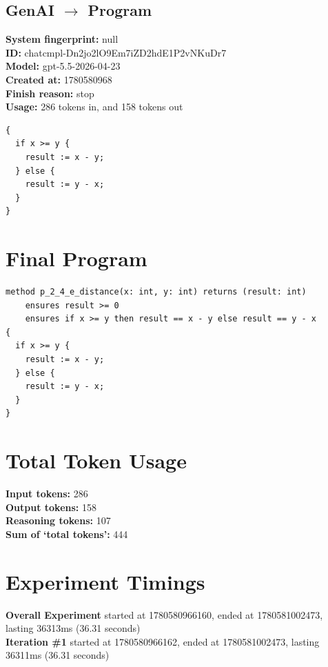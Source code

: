 \documentclass{article}
\begin{document}
\subsection*{GenAI $\rightarrow$ Program}
\textbf{System fingerprint: }null
\\\textbf{ID: }chatcmpl-Dn2jo2lO9Em7iZD2hdE1P2vNKuDr7
\\\textbf{Model: }gpt-5.5-2026-04-23
\\\textbf{Created at: }1780580968
\\\textbf{Finish reason: }stop
\\\textbf{Usage: }286 tokens in, and 158 tokens out
\begin{lstlisting}
{
  if x >= y {
    result := x - y;
  } else {
    result := y - x;
  }
}
\end{lstlisting}
\section*{Final Program}
\begin{lstlisting}
method p_2_4_e_distance(x: int, y: int) returns (result: int)
	ensures result >= 0
	ensures if x >= y then result == x - y else result == y - x
{
  if x >= y {
    result := x - y;
  } else {
    result := y - x;
  }
}
\end{lstlisting}
\section*{Total Token Usage}
\textbf{Input tokens: }286
\\\textbf{Output tokens: }158
\\\textbf{Reasoning tokens: }107
\\\textbf{Sum of `total tokens': }444
\section*{Experiment Timings}
\textbf{Overall Experiment} started at 1780580966160, ended at 1780581002473, lasting 36313ms (36.31 seconds)
\\\textbf{Iteration \#1} started at 1780580966162, ended at 1780581002473, lasting 36311ms (36.31 seconds)
\end{document}
